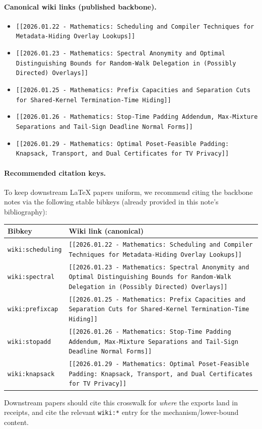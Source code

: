 \documentclass[11pt]{article}
\begin{document}
\paragraph{Canonical wiki links (published backbone).}
\begin{itemize}[leftmargin=1.2em]
\item \texttt{[[2026.01.22 - Mathematics: Scheduling and Compiler Techniques for Metadata-Hiding Overlay Lookups]]}
\item \texttt{[[2026.01.23 - Mathematics: Spectral Anonymity and Optimal Distinguishing Bounds for Random-Walk Delegation in (Possibly Directed) Overlays]]}
\item \texttt{[[2026.01.25 - Mathematics: Prefix Capacities and Separation Cuts for Shared-Kernel Termination-Time Hiding]]}
\item \texttt{[[2026.01.26 - Mathematics: Stop-Time Padding Addendum, Max-Mixture Separations and Tail-Sign Deadline Normal Forms]]}
\item \texttt{[[2026.01.29 - Mathematics: Optimal Poset-Feasible Padding: Knapsack, Transport, and Dual Certificates for TV Privacy]]}
\end{itemize}

\paragraph{Recommended citation keys.}
To keep downstream \LaTeX{} papers uniform, we recommend citing the backbone notes via the following stable bibkeys (already provided in this note's bibliography):
\begin{center}
\small
\begin{tabularx}{0.98\linewidth}{@{}LY@{}}
\toprule
Bibkey & Wiki link (canonical) \\
\midrule
\texttt{wiki:scheduling} & \texttt{[[2026.01.22 - Mathematics: Scheduling and Compiler Techniques for Metadata-Hiding Overlay Lookups]]} \\
\texttt{wiki:spectral} & \texttt{[[2026.01.23 - Mathematics: Spectral Anonymity and Optimal Distinguishing Bounds for Random-Walk Delegation in (Possibly Directed) Overlays]]} \\
\texttt{wiki:prefixcap} & \texttt{[[2026.01.25 - Mathematics: Prefix Capacities and Separation Cuts for Shared-Kernel Termination-Time Hiding]]} \\
\texttt{wiki:stopadd} & \texttt{[[2026.01.26 - Mathematics: Stop-Time Padding Addendum, Max-Mixture Separations and Tail-Sign Deadline Normal Forms]]} \\
\texttt{wiki:knapsack} & \texttt{[[2026.01.29 - Mathematics: Optimal Poset-Feasible Padding: Knapsack, Transport, and Dual Certificates for TV Privacy]]} \\
\bottomrule
\end{tabularx}
\end{center}
Downstream papers should cite this crosswalk for \emph{where} the exports land in receipts, and cite the relevant \texttt{wiki:*} entry for the mechanism/lower-bound content.
\end{document}
